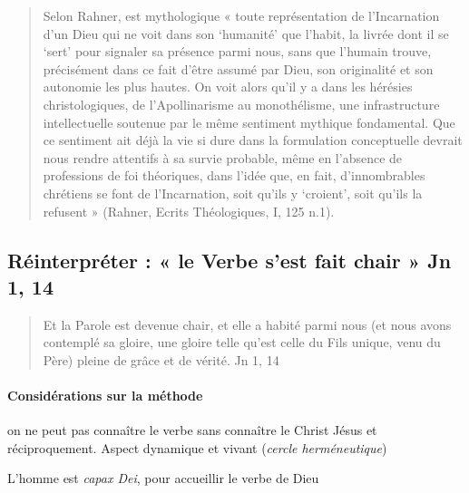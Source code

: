 \begin{quote}
    Selon Rahner, est mythologique « toute représentation de l’Incarnation d’un Dieu qui ne voit dans son ‘humanité’ que l’habit, la livrée dont il se ‘sert’ pour signaler sa présence parmi nous, sans que l’humain trouve, précisément dans ce fait d’être assumé par Dieu, son originalité et son autonomie les plus hautes. On voit alors qu’il y a dans les hérésies christologiques, de l’Apollinarisme au monothélisme, une infrastructure intellectuelle soutenue par le même sentiment mythique fondamental.  Que ce sentiment ait déjà la vie si dure dans la formulation conceptuelle devrait nous rendre attentifs à sa survie probable, même en l’absence de professions de foi théoriques, dans l’idée que, en fait, d’innombrables chrétiens se font de l’Incarnation, soit qu’ils y ‘croient’, soit qu’ils la refusent » (Rahner, Ecrits Théologiques, I, 125 n.1). 
\end{quote}

\subsection{Réinterpréter : « le Verbe s’est fait chair » Jn 1, 14}

\begin{quote}
    Et la Parole est devenue chair, et elle a habité parmi nous (et nous avons contemplé sa gloire, une gloire telle qu'est celle du Fils unique, venu du Père) pleine de grâce et de vérité. Jn 1, 14
\end{quote}


\paragraph{Considérations sur la méthode }

on ne peut pas connaître le verbe sans connaître le Christ Jésus et réciproquement. Aspect dynamique et vivant (\textit{cercle herméneutique}) 

L'homme est \textit{capax Dei}, pour accueillir le verbe de Dieu



